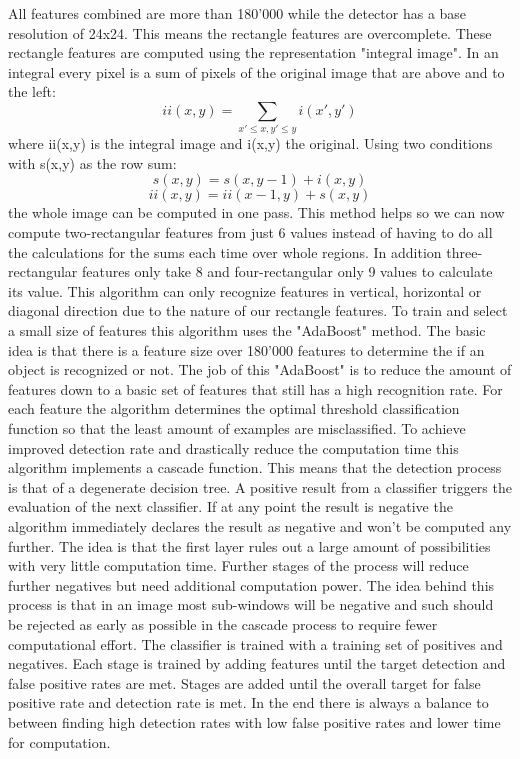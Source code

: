 All features combined are more than 180'000 while the detector has a base resolution of 24x24. This means the rectangle features are overcomplete.
These rectangle features are computed using the representation "integral image". In an integral every pixel is a sum of pixels of the original image that are above and to the left:
\begin{equation}ii(x,y) = \sum_{x'\leq x, y'\leq y} i(x',y')\end{equation}
where ii(x,y) is the integral image and i(x,y) the original. Using two conditions with s(x,y) as the row sum:
\begin{equation}s(x,y) = s(x,y-1)+i(x,y)\end{equation}
\begin{equation}ii(x,y) = ii(x-1,y)+s(x,y)\end{equation}
the whole image can be computed in one pass.
This method helps so we can now compute two-rectangular features from just 6 values instead of having to do all the calculations for the sums each time over whole regions. In addition three-rectangular features only take 8 and four-rectangular only 9 values to calculate its value. This algorithm can only recognize features in vertical, horizontal or diagonal direction due to the nature of our rectangle features.
To train and select a small size of features this algorithm uses the "AdaBoost" method. The basic idea is that there is a feature size over 180'000 features to determine the if an object is recognized or not. The job of this "AdaBoost" is to reduce the amount of features down to a basic set of features that still has a high recognition rate. For each feature the algorithm determines the optimal threshold classification function so that the least amount of examples are misclassified.
To achieve improved detection rate and drastically reduce the computation time this algorithm implements a cascade function. This means that the detection process is that of a degenerate decision tree. A positive result from a classifier triggers the evaluation of the next classifier. If at any point the result is negative the algorithm immediately declares the result as negative and won't be computed any further. The idea is that the first layer rules out a large amount of possibilities with very little computation time. Further stages of the process will reduce further negatives but need additional computation power. The idea behind this process is that in an image most sub-windows will be negative and such should be rejected as early as possible in the cascade process to require fewer computational effort.
The classifier is trained with a training set of positives and negatives. Each stage is trained by adding features until the target detection and false positive rates are met. Stages are added until the overall target for false positive rate and detection rate is met. In the end there is always a balance to between finding high detection rates with low false positive rates and lower time for computation.

